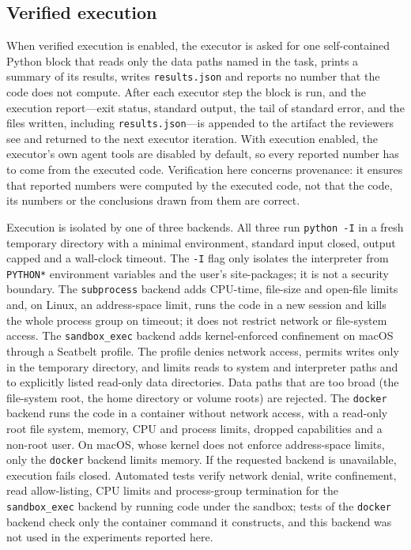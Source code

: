 \documentclass[10pt,letterpaper]{article}
\begin{document}
\subsection*{Verified execution}

When verified execution is enabled, the executor is asked for one self-contained Python block that reads only the data paths named in the task, prints a summary of its results, writes \texttt{results.json} and reports no number that the code does not compute. After each executor step the block is run, and the execution report---exit status, standard output, the tail of standard error, and the files written, including \texttt{results.json}---is appended to the artifact the reviewers see and returned to the next executor iteration. With execution enabled, the executor's own agent tools are disabled by default, so every reported number has to come from the executed code. Verification here concerns provenance: it ensures that reported numbers were computed by the executed code, not that the code, its numbers or the conclusions drawn from them are correct.

Execution is isolated by one of three backends. All three run \texttt{python -I} in a fresh temporary directory with a minimal environment, standard input closed, output capped and a wall-clock timeout. The \texttt{-I} flag only isolates the interpreter from \texttt{PYTHON*} environment variables and the user's site-packages; it is not a security boundary. The \texttt{subprocess} backend adds CPU-time, file-size and open-file limits and, on Linux, an address-space limit, runs the code in a new session and kills the whole process group on timeout; it does not restrict network or file-system access. The \texttt{sandbox\_exec} backend adds kernel-enforced confinement on macOS through a Seatbelt profile. The profile denies network access, permits writes only in the temporary directory, and limits reads to system and interpreter paths and to explicitly listed read-only data directories. Data paths that are too broad (the file-system root, the home directory or volume roots) are rejected. The \texttt{docker} backend runs the code in a container without network access, with a read-only root file system, memory, CPU and process limits, dropped capabilities and a non-root user. On macOS, whose kernel does not enforce address-space limits, only the \texttt{docker} backend limits memory. If the requested backend is unavailable, execution fails closed. Automated tests verify network denial, write confinement, read allow-listing, CPU limits and process-group termination for the \texttt{sandbox\_exec} backend by running code under the sandbox; tests of the \texttt{docker} backend check only the container command it constructs, and this backend was not used in the experiments reported here.
\end{document}

